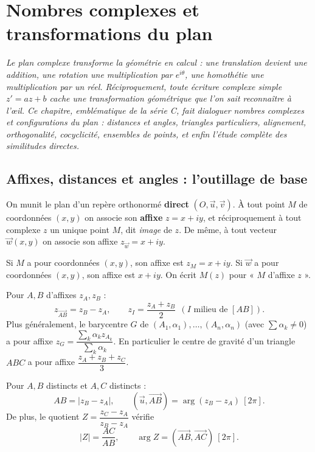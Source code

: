 \chapter{Nombres complexes et transformations du plan}

\noindent\textit{Le plan complexe transforme la géométrie en calcul : une translation devient
une addition, une rotation une multiplication par $e^{i\theta}$, une homothétie une multiplication
par un réel. Réciproquement, toute écriture complexe simple $z'=az+b$ cache une transformation
géométrique que l'on sait reconnaître à l'\oe il. Ce chapitre, emblématique de la série C, fait
dialoguer nombres complexes et configurations du plan : distances et angles, triangles
particuliers, alignement, orthogonalité, cocyclicité, ensembles de points, et enfin l'étude
complète des similitudes directes.}
\vspace{8pt}

\section{Affixes, distances et angles : l'outillage de base}

On munit le plan d'un repère orthonormé \textbf{direct} $(O,\vec u,\vec v)$. À tout point $M$ de
coordonnées $(x,y)$ on associe son \textbf{affixe} $z=x+iy$, et réciproquement à tout complexe $z$
un unique point $M$, dit \emph{image} de $z$. De même, à tout vecteur $\vec w(x,y)$ on associe son
affixe $z_{\vec w}=x+iy$.

\begin{definition}
Si $M$ a pour coordonnées $(x,y)$, son affixe est $z_M=x+iy$. Si $\vec w$ a pour coordonnées
$(x,y)$, son affixe est $x+iy$. On écrit $M(z)$ pour « $M$ d'affixe $z$ ».
\end{definition}

\begin{propriete}
Pour $A,B$ d'affixes $z_A,z_B$ :
\[
z_{\overrightarrow{AB}}=z_B-z_A,\qquad z_I=\frac{z_A+z_B}2\ \ (I\text{ milieu de }[AB]).
\]
Plus généralement, le barycentre $G$ de $(A_1,\alpha_1),\dots,(A_n,\alpha_n)$ (avec
$\sum\alpha_k\neq0$) a pour affixe $z_G=\dfrac{\sum_k\alpha_k z_{A_k}}{\sum_k\alpha_k}$.
En particulier le centre de gravité d'un triangle $ABC$ a pour affixe $\dfrac{z_A+z_B+z_C}3$.
\end{propriete}

\begin{propriete}
Pour $A,B$ distincts et $A,C$ distincts :
\[
AB=|z_B-z_A|,\qquad (\vec u,\overrightarrow{AB})=\arg(z_B-z_A)\ [2\pi].
\]
De plus, le quotient $Z=\dfrac{z_C-z_A}{z_B-z_A}$ vérifie
\[
|Z|=\frac{AC}{AB},\qquad \arg Z=(\overrightarrow{AB},\overrightarrow{AC})\ [2\pi].
\]
\end{propriete}

